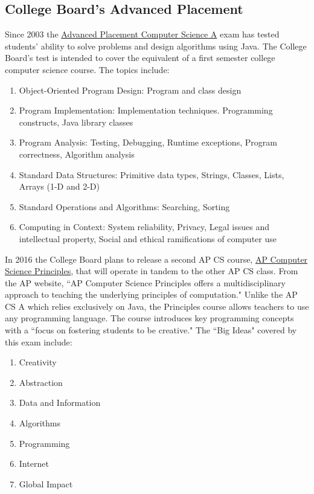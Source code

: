\subsection{College Board's Advanced Placement}
\label{CBAP}Since 2003 the \href{http://media.collegeboard.com/digitalServices/pdf/ap/ap-course-overviews/ap-computer-science-a-course-overview.pdf}{Advanced Placement Computer Science A} exam has tested students' ability to solve problems and design algorithms using Java. The College Board's test is intended to cover the equivalent of a first semester college computer science course. The topics include:
\begin{enumerate}
	\item Object-Oriented Program Design:  Program and class design 
	\item Program Implementation: Implementation techniques. Programming constructs, Java library classes
	\item Program Analysis: Testing, Debugging, Runtime exceptions, Program correctness, Algorithm analysis
	\item Standard Data Structures:  Primitive data types, Strings, Classes, Lists, Arrays (1-D and 2-D) 
	\item Standard Operations and Algorithms: Searching, Sorting
	\item Computing in Context: System reliability, Privacy, Legal issues and intellectual property, Social and ethical ramifications of computer use 
\end{enumerate}
In 2016 the College Board plans to release a second AP CS course, \href{https://secure-media.collegeboard.org/digitalServices/pdf/ap/ap-computer-science-principles-curriculum-framework.pdf}{AP Computer Science Principles}, that will operate in tandem to the other AP CS class. From the AP website, ``AP Computer Science Principles offers a multidisciplinary approach to teaching the underlying principles of computation." Unlike the AP CS A which relies exclusively on Java, the Principles course allows teachers to use any programming language. The course introduces key programming concepts with a ``focus on fostering students to be creative." The ``Big Ideas" covered by this exam include:
\begin{enumerate}
	\item Creativity
	\item Abstraction
	\item Data and Information
	\item Algorithms
	\item Programming
	\item Internet
	\item Global Impact
\end{enumerate} \par
